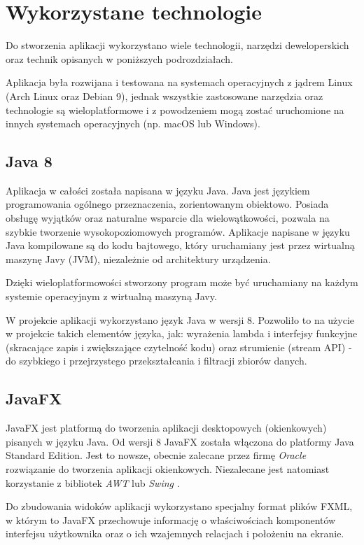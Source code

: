 \section{Wykorzystane technologie}
Do stworzenia aplikacji wykorzystano wiele technologii, narzędzi deweloperskich oraz technik opisanych w poniższych podrozdziałach.

Aplikacja była rozwijana i testowana na systemach operacyjnych z jądrem Linux (Arch Linux oraz Debian 9), jednak wszystkie zastosowane narzędzia oraz technologie są wieloplatformowe i z powodzeniem mogą zostać uruchomione na innych systemach operacyjnych (np. macOS lub Windows).

\subsection{Java 8}
Aplikacja w całości została napisana w języku Java.
Java jest językiem programowania ogólnego przeznaczenia, zorientowanym obiektowo. Posiada obsługę wyjątków oraz naturalne wsparcie dla wielowątkowości, pozwala na szybkie tworzenie wysokopoziomowych programów. Aplikacje napisane w języku Java kompilowane są do kodu bajtowego, który uruchamiany jest przez wirtualną maszynę Javy (JVM), niezależnie od architektury urządzenia.

Dzięki wieloplatformowości stworzony program może być uruchamiany na każdym systemie operacyjnym z wirtualną maszyną Javy.

W projekcie aplikacji wykorzystano język Java w wersji 8. 
Pozwoliło to na użycie w projekcie takich elementów języka, jak: wyrażenia lambda i interfejsy funkcyjne (skracające zapis i zwiększające czytelność kodu) oraz strumienie (stream API) - do szybkiego i przejrzystego przekształcania i filtracji zbiorów danych.

\subsection{JavaFX}
JavaFX jest platformą do tworzenia aplikacji desktopowych (okienkowych) pisanych w języku Java.
Od wersji 8 JavaFX została włączona do platformy Java Standard Edition.
Jest to nowsze, obecnie zalecane przez firmę {\it Oracle} rozwiązanie do tworzenia aplikacji okienkowych. Niezalecane jest natomiast korzystanie z bibliotek {\it AWT} lub {\it Swing} \cite{javafx-replacing-swing}.

Do zbudowania widoków aplikacji wykorzystano specjalny format plików FXML, w którym to JavaFX przechowuje informację o właściwościach komponentów interfejsu użytkownika oraz o ich wzajemnych relacjach i położeniu na ekranie.

